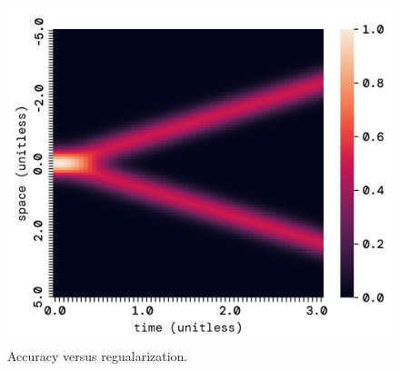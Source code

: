 \documentclass[twoside,11pt]{report}
\begin{document}
\begin{figure}[!ht]
\begin{minipage}[t]{0.5\textwidth - 1mm}
            \begin{center}
                \includegraphics[width=\textwidth]{../runsAndFigures/wave_analytic.png}
            \end{center}
            \caption
            {
                Accuracy versus regualarization.
            }\label{fig:wave_analytic}
        \end{minipage}
    \end{figure}
\end{document}
